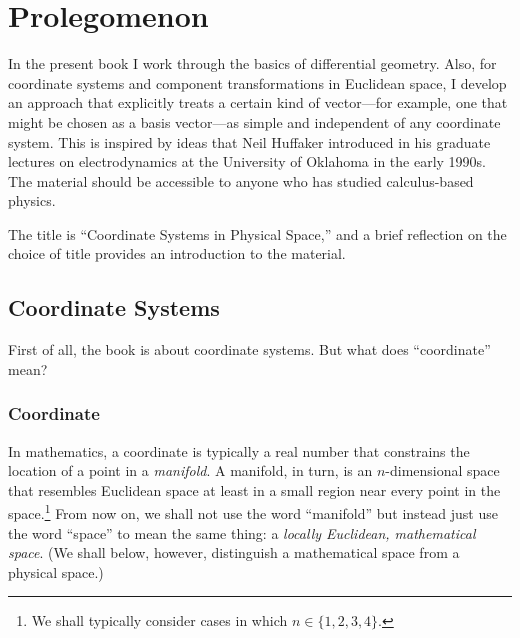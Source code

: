 \documentclass[twocolumn,10pt]{book}
\begin{document}


\pagestyle{fancy}
\lhead{%
   \sffamily
   \textbf{\doctitle}\\
   \docsubtitle}
\chead{}

\renewcommand{\headrulewidth}{1pt}
\renewcommand{\footrulewidth}{1pt}
\lfoot{}
\cfoot{\sffamily\thepage}
\rfoot{}

\mainmatter

\chapter{Prolegomenon}

In the present book I work through the basics of differential geometry.  Also,
for coordinate systems and component transformations in Euclidean space, I
develop an approach that explicitly treats a certain kind of vector---for
example, one that might be chosen as a basis vector---as simple and independent
of any coordinate system.  This is inspired by ideas that Neil Huffaker
introduced in his graduate lectures on electrodynamics at the University of
Oklahoma in the early 1990s.  The material should be accessible to anyone who
has studied calculus-based physics.

The title is ``Coordinate Systems in Physical Space,'' and a brief reflection
on the choice of title provides an introduction to the material.

\section{Coordinate Systems}

First of all, the book is about coordinate systems.  But what does
``coordinate'' mean?

\subsection{Coordinate}

In mathematics, a coordinate is typically a real number that constrains the
location of a point in a \emph{manifold}.  A manifold, in turn, is an
$n$-dimensional space that resembles Euclidean space at least in a small region
near every point in the space.\footnote{%
   We shall typically consider cases in which $n \in \{1, 2, 3, 4\}$.%
}
From now on, we shall not use the word ``manifold'' but instead just use the
word ``space'' to mean the same thing: a \emph{locally Euclidean, mathematical
space}.  (We shall below, however, distinguish a mathematical space from a
physical space.)
\end{document}
